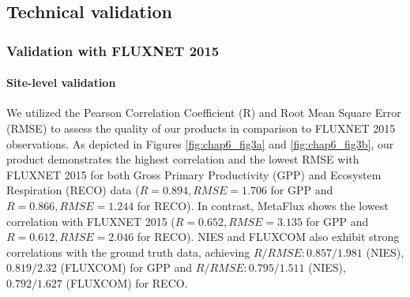 \subsection{Technical validation}
\subsubsection*{Validation with FLUXNET 2015}
\paragraph*{Site-level validation}
We utilized the Pearson Correlation Coefficient (R) and Root Mean Square Error (RMSE) to assess the quality of our products in comparison to FLUXNET 2015 observations. As depicted in Figures \ref{fig:chap6_fig3a} and \ref{fig:chap6_fig3b}, our product demonstrates the highest correlation and the lowest RMSE with FLUXNET 2015 for both Gross Primary Productivity (GPP) and Ecosystem Respiration (RECO) data ($R = 0.894, RMSE = 1.706$ for GPP and $R = 0.866, RMSE = 1.244$ for RECO). In contrast, MetaFlux shows the lowest correlation with FLUXNET 2015 ($R = 0.652, RMSE = 3.135$ for GPP and $R = 0.612, RMSE = 2.046$ for RECO). NIES and FLUXCOM also exhibit strong correlations with the ground truth data, achieving $R/RMSE: 0.857/1.981$ (NIES), $0.819/2.32$ (FLUXCOM) for GPP and $R/RMSE: 0.795/1.511$ (NIES), $0.792/1.627$ (FLUXCOM) for RECO. \par

